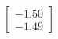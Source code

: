 \documentclass[preview]{standalone}
\begin{document}
\begin{align*}
\begin{bmatrix} -1.50 \\ -1.49 \end{bmatrix}
\end{align*}
\end{document}
